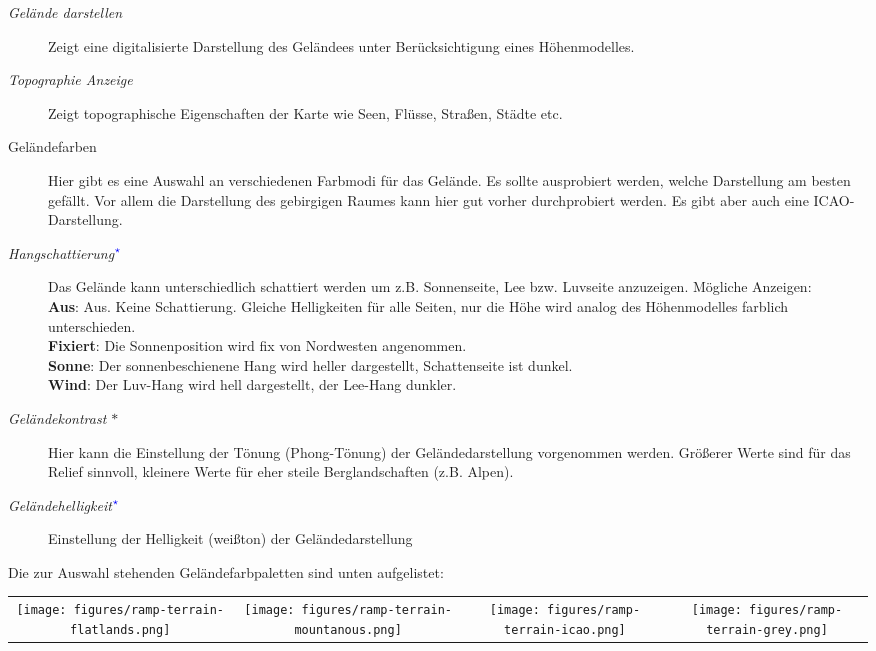 \begin{description}
\item[\textit{Gelände darstellen}]  Zeigt eine digitalisierte Darstellung des Geländees unter Berücksichtigung eines Höhenmodelles.
\item[\textit{Topographie Anzeige}]  Zeigt topographische Eigenschaften der Karte wie Seen, Flüsse, Straßen, Städte etc.\
\item[Geländefarben]  Hier gibt es eine Auswahl an verschiedenen Farbmodi für das Gelände. Es sollte ausprobiert werden,
welche Darstellung am besten gefällt. Vor allem die Darstellung des gebirgigen Raumes kann hier gut vorher durchprobiert werden.
Es gibt aber auch eine ICAO-Darstellung.
\item[\textit{Hangschattierung$^{\textcolor{blue}{\star}}$}]  \label{conf:shading} Das Gelände kann unterschiedlich schattiert werden
um z.B. Sonnenseite, Lee bzw. Luvseite anzuzeigen. Mögliche Anzeigen:\\
{\bf Aus}: Aus. Keine Schattierung. Gleiche  Helligkeiten für alle Seiten, nur die Höhe wird analog des
Höhenmodelles farblich unterschieden.\\
{\bf Fixiert}: Die Sonnenposition wird fix von Nordwesten angenommen.\\
{\bf Sonne}: Der sonnenbeschienene  Hang wird heller dargestellt, Schattenseite ist dunkel.\\
{\bf Wind}: Der Luv-Hang wird hell dargestellt, der Lee-Hang dunkler.\\ 
\item[\textit{Geländekontrast $\ast$}]  Hier kann die Einstellung der Tönung (Phong-Tönung) der Geländedarstellung
vorgenommen werden.
Größerer Werte sind für das Relief sinnvoll, kleinere Werte für eher
steile Berglandschaften (z.B. Alpen).
\item[\textit{Geländehelligkeit$^{\textcolor{blue}{\star}}$}]  Einstellung der Helligkeit (weißton) der Geländedarstellung
\end{description}

Die zur Auswahl stehenden Geländefarbpaletten sind unten aufgelistet:

\begin{longtable}{c c c c}
\texttt{[image: figures/ramp-terrain-flatlands.png]}&
\texttt{[image: figures/ramp-terrain-mountanous.png]}&
\texttt{[image: figures/ramp-terrain-icao.png]}&
\texttt{[image: figures/ramp-terrain-grey.png]}
\end{longtable}

